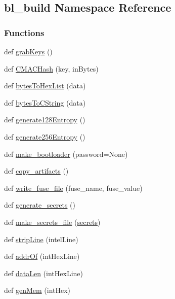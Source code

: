 \hypertarget{namespacebl__build}{}\subsection{bl\+\_\+build Namespace Reference}
\label{namespacebl__build}
\subsubsection*{Functions}
\begin{DoxyCompactItemize}
\item 
def \hyperlink{namespacebl__build_a8580a45f9e0e7d6f46bb0bf7cca40ce4}{grab\+Keys} ()
\item 
def \hyperlink{namespacebl__build_a097a5019a83d65ad61254db9a76624eb}{C\+M\+A\+C\+Hash} (key, in\+Bytes)
\item 
def \hyperlink{namespacebl__build_ae3dfab9be466704491cdc270ac523004}{bytes\+To\+Hex\+List} (data)
\item 
def \hyperlink{namespacebl__build_a18e5476f014231406705f66d9aac77c2}{bytes\+To\+C\+String} (data)
\item 
def \hyperlink{namespacebl__build_a8672b3c1dd7811f44d8ca6472ef674c2}{generate128\+Entropy} ()
\item 
def \hyperlink{namespacebl__build_aa34856c463a31f6a99675774f4d6e861}{generate256\+Entropy} ()
\item 
def \hyperlink{namespacebl__build_a2a9c9e378b6b3a07e151534a9cad784d}{make\+\_\+bootloader} (password=None)
\item 
def \hyperlink{namespacebl__build_acf40ffadbc5a33f27984829b1089e12a}{copy\+\_\+artifacts} ()
\item 
def \hyperlink{namespacebl__build_a437292e7f5118fd4cf6fd3f4fd30ede2}{write\+\_\+fuse\+\_\+file} (fuse\+\_\+name, fuse\+\_\+value)
\item 
def \hyperlink{namespacebl__build_a3311e245be558d39e0edf14ed88da1df}{generate\+\_\+secrets} ()
\item 
def \hyperlink{namespacebl__build_a5f60fa45fee5cfdc7a4e9d1e19150055}{make\+\_\+secrets\+\_\+file} (\hyperlink{namespacebl__build_a7ef58b6350bb8f1ea4b81d24cac72a55}{secrets})
\item 
def \hyperlink{namespacebl__build_a4154658d421cdf9e8f1352f8347f3df8}{strip\+Line} (intel\+Line)
\item 
def \hyperlink{namespacebl__build_ad77bcbb2ba1cd1338b437a74bf2e995c}{addr\+Of} (int\+Hex\+Line)
\item 
def \hyperlink{namespacebl__build_ab5b71cee689998b4be0b67b767416016}{data\+Len} (int\+Hex\+Line)
\item 
def \hyperlink{namespacebl__build_a8dc8ae3d67a3c82b7c54bc26252467bd}{gen\+Mem} (int\+Hex)
\end{DoxyCompactItemize}
